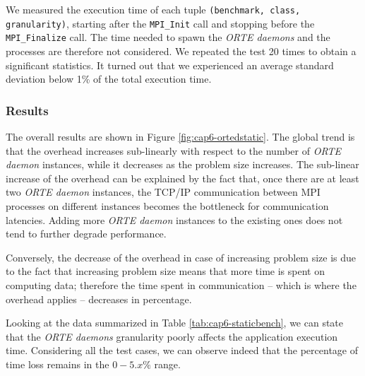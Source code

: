 We measured the execution time of each tuple \texttt{(benchmark, class,}\\
\texttt{granularity)}, starting after the \texttt{MPI\_Init} call and
stopping before the\\
\texttt{MPI\_Finalize} call. The time needed to
spawn the \emph{ORTE daemons} and the processes are therefore not considered. We
repeated the test 20 times to obtain a significant statistics. It turned out
that we experienced an average standard deviation below 1\% of the total
execution time.


\subsubsection{Results}
The overall results are shown in Figure \ref{fig:cap6-ortedstatic}. The global
trend is that the overhead increases sub-linearly with respect to the number
of \emph{ORTE daemon} instances, while it decreases as the problem size increases.
The sub-linear increase of the overhead can be explained by the fact that,
once there are at least two \emph{ORTE daemon} instances, the TCP/IP communication
between MPI processes on different instances becomes the bottleneck for
communication latencies.
Adding more \emph{ORTE daemon} instances to the existing ones does not tend to
further degrade performance.

Conversely, the decrease of the overhead in case of
increasing problem size is due to the fact that increasing
problem size means that more time is spent on computing data; therefore
the time spent in communication -- which is where the overhead applies
-- decreases in percentage.

Looking at the data summarized in Table \ref{tab:cap6-staticbench}, we can state that the \emph{ORTE daemons} granularity poorly
affects the application execution time. Considering all the test cases, we can
observe indeed that the percentage of time loss remains in the $0-5.x\%$ range.



